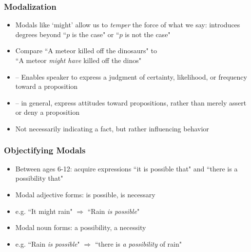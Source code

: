 \begin{frame}
\frametitle{Modalization}

\begin{itemize}[<+->]

\item Modals like `might' allow us to \textit{temper} the force of what we say: introduces degrees beyond ``$p$ is the case" or ``$p$ is not the case"

\item Compare ``A meteor killed off the dinosaurs" to \\ ``A meteor \textit{might have} killed off the dinos"

\item[] -- Enables speaker to express a judgment of certainty, likelihood, or frequency toward a proposition

\item[] -- in general, express attitudes toward propositions, rather than merely assert or deny a proposition 

\item Not necessarily indicating a fact, but rather influencing behavior

\end{itemize}
\end{frame}

\begin{frame}
\frametitle{Objectifying Modals}

\begin{itemize}[<+->]

\item Between ages 6-12: acquire expressions ``it is possible that" and ``there is a possibility that" 

\item Modal adjective forms: is possible, is necessary

\item[] e.g. ``It might rain" $\Rightarrow$ ``Rain \textit{is possible}"

\item Modal noun forms: a possibility, a necessity

\item[] e.g. ``Rain \textit{is possible}" $\Rightarrow$ ``there is \textit{a possibility} of rain"


\end{itemize}
\end{frame}


